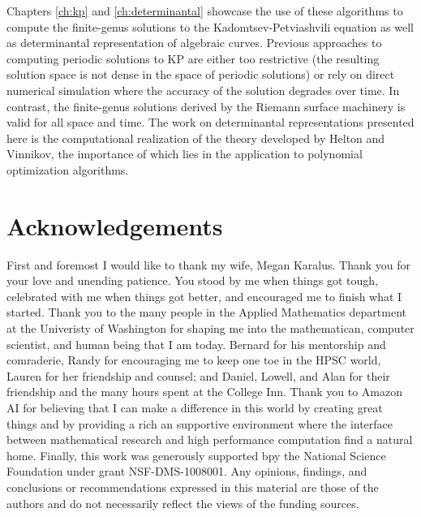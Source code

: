 Chapters \ref{ch:kp} and \ref{ch:determinantal} showcase the use of these
algorithms to compute the finite-genus solutions to the Kadomtsev-Petviashvili
equation as well as determinantal representation of algebraic curves. Previous
approaches to computing periodic solutions to KP are either too restrictive (the
resulting solution space is not dense in the space of periodic solutions) or
rely on direct numerical simulation where the accuracy of the solution degrades
over time. In contrast, the finite-genus solutions derived by the Riemann
surface machinery is valid for all space and time. The work on determinantal
representations presented here is the computational realization of the theory
developed by Helton and Vinnikov, the importance of which lies in the
application to polynomial optimization algorithms.

\section{Acknowledgements} \label{sec:acknowledgments}

First and foremost I would like to thank my wife, Megan Karalus. Thank you for
your love and unending patience. You stood by me when things got tough,
celebrated with me when things got better, and encouraged me to finish what I
started. Thank you to the many people in the Applied Mathematics department at
the Univeristy of Washington for shaping me into the mathematican, computer
scientist, and human being that I am today. Bernard for his mentorship and
comraderie, Randy for encouraging me to keep one toe in the HPSC world, Lauren
for her friendship and counsel; and Daniel, Lowell, and Alan for their
friendship and the many hours spent at the College Inn. Thank you to Amazon AI
for believing that I can make a difference in this world by creating great
things and by providing a rich an supportive environment where the interface
between mathematical research and high performance computation find a natural
home. Finally, this work was generously supported bpy the National Science
Foundation under grant NSF-DMS-1008001. Any opinions, findings, and conclusions
or recommendations expressed in this material are those of the authors and do
not necessarily reflect the views of the funding sources.
